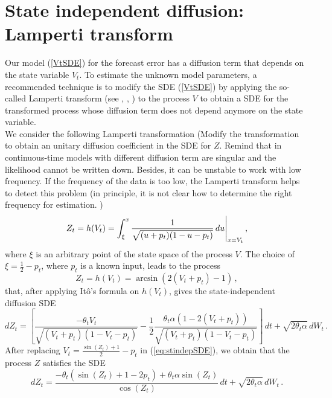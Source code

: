 \documentclass[11pt]{article}
\begin{document}
\section{State independent diffusion: Lamperti transform} \label{Section_3}

Our model (\ref{VtSDE}) for the forecast error has a diffusion term that depends on the state variable $V_t$. To estimate the unknown model parameters, a recommended technique is to modify the SDE (\ref{VtSDE}) by applying the so-called Lamperti transform (see \cite[40--41]{iacus1}, \cite{moma}, \cite[98--100]{saso}) to the process $V$ to obtain a SDE for the transformed process whose diffusion term does not depend anymore on the state variable. \\

We consider the following Lamperti transformation  {\color{red} (Modify the transformation to obtain an unitary diffusion coefficient in the SDE for $Z$. Remind that in continuous-time models with different diffusion term are singular and the likelihood cannot be written down. Besides, it can be unstable to work with low frequency. If the frequency of the data is too low, the Lamperti transform helps to detect this problem (in principle, it is not clear how to determine the right frequency for estimation. )}
\begin{equation}
Z_t = h(V_t) = \int_{\xi}^{x} \frac{1}{\sqrt{(u + p_t)(1 - u - p_t)}} \,du \Bigg{\vert}_{x = V_t} \,,
\end{equation}
where $\xi$ is an arbitrary point of the state space of the process $V$. The choice of $\xi = \frac{1}{2} - p_t$, where $p_t$ is a known input, leads to the process 
\begin{equation}
Z_t = h(V_t) = \arcsin (2(V_t + p_t) -1)\,,
\end{equation}
that, after applying It\^{o}'s formula on $h(V_t)$, gives the state-independent diffusion SDE
\begin{equation}
dZ_t = \left[  \frac{- \theta_t V_t}{\sqrt{(V_t + p_t)(1 - V_t - p_t)}} - \frac{1}{2} \frac{\theta_t \alpha \left( 1 - 2 (V_t + p_t)\right)}{\sqrt{(V_t + p_t)(1 - V_t - p_t)}}  \right] \,dt + \sqrt{2 \theta_t \alpha}\, dW_t \,. \label{eq:stindepSDE}
\end{equation}
After replacing $V_t = \frac{\sin(Z_t) + 1}{2} - p_t$ in (\ref{eq:stindepSDE}), we obtain that the  process $Z$ satisfies the SDE
\begin{equation}
dZ_t = \frac{- \theta_t (\sin(Z_t) + 1 - 2 p_t) + \theta_t \alpha \sin{(Z_t)}}{\cos{(Z_t)}} \,dt + \sqrt{2 \theta_t \alpha}\, dW_t \,. 
\end{equation}
\end{document}
